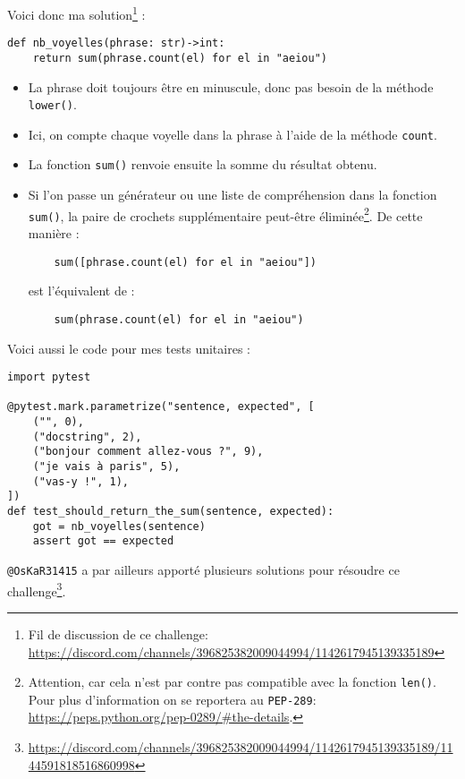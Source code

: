 Voici donc ma solution\footnote{Fil de discussion de ce challenge: \url{https://discord.com/channels/396825382009044994/1142617945139335189}} :
\begin{lstlisting}
def nb_voyelles(phrase: str)->int:
	return sum(phrase.count(el) for el in "aeiou")
\end{lstlisting}
\medskip

\begin{itemize}
	\item[\textbullet] La phrase doit toujours être en minuscule, donc pas besoin de la méthode \texttt{lower()}.
	\item[\textbullet] Ici, on compte chaque voyelle dans la phrase à l'aide de la méthode \texttt{count}.
	\item[\textbullet] La fonction \texttt{sum()} renvoie ensuite la somme du résultat obtenu.
	\item[\textbullet] Si l'on passe un générateur ou une liste de compréhension dans la fonction \texttt{sum()}, la paire de crochets supplémentaire peut-être éliminée\footnote{ Attention, car cela n'est par contre pas compatible avec la fonction \texttt{len()}. Pour plus d'information on se reportera au \texttt{PEP-289}: \url{https://peps.python.org/pep-0289/\#the-details}.}. De cette manière :
	\begin{verbatim}
	sum([phrase.count(el) for el in "aeiou"])
	\end{verbatim}
	est l'équivalent de :
	\begin{verbatim}
	sum(phrase.count(el) for el in "aeiou")
	\end{verbatim}
\end{itemize}
\medskip

Voici aussi le code pour mes tests unitaires :
\begin{lstlisting}
import pytest

@pytest.mark.parametrize("sentence, expected", [
    ("", 0),
    ("docstring", 2),
    ("bonjour comment allez-vous ?", 9),
    ("je vais à paris", 5),
    ("vas-y !", 1),
]) 
def test_should_return_the_sum(sentence, expected):
    got = nb_voyelles(sentence)
    assert got == expected
\end{lstlisting}
\medskip

\texttt{@OsKaR31415} a par ailleurs apporté plusieurs solutions pour résoudre ce challenge\footnote{\url{https://discord.com/channels/396825382009044994/1142617945139335189/1144591818516860998}}.